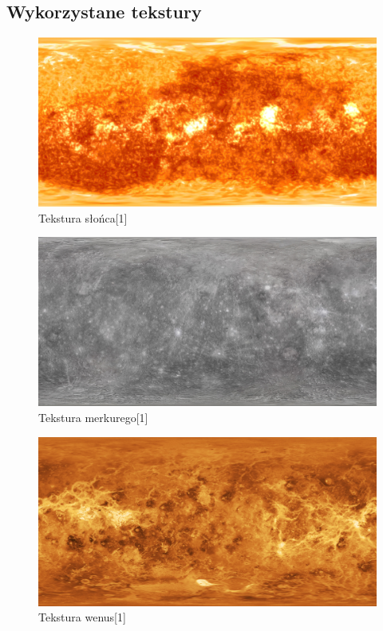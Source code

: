 \documentclass{article}
\begin{document}
        \subsection{Wykorzystane tekstury}
        \begin{figure}[ht]
            \centering
            \includegraphics[width=\textwidth]{images/2k_sun.jpg}
            \caption{Tekstura słońca[1]}
            \label{fig:sun}
        \end{figure}
        \FloatBarrier
        \begin{figure}[ht]
            \centering
            \includegraphics[width=\textwidth]{images/2k_mercury.jpg}
            \caption{Tekstura merkurego[1]}
            \label{fig:mercury}
        \end{figure}
        \FloatBarrier
        \begin{figure}[ht]
            \centering
            \includegraphics[width=\textwidth]{images/2k_venus_surface.jpg}
            \caption{Tekstura wenus[1]}
            \label{fig:venus}
        \end{figure}
\end{document}
